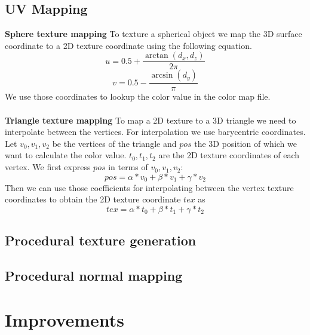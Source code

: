 \documentclass[sigconf, nonacm]{acmart}
\begin{document}
\subsection{UV Mapping}
\textbf{Sphere texture mapping} 
To texture a spherical object we map the 3D surface coordinate to a 2D texture coordinate using the following equation.
\[u=0.5+\frac{\arctan(d_x, d_z)}{2\pi}\]
\[v=0.5-\frac{\arcsin(d_y)}{\pi}\]
We use those coordinates to lookup the color value in the color map file.\\
\\
\textbf{Triangle texture mapping} 
To map a 2D texture to a 3D triangle we need to interpolate between the vertices. For interpolation we use barycentric coordinates.
Let \(v_0, v_1, v_2\) be the vertices of the triangle and \(pos\) the 3D position of which we want to calculate the color value. 
\(t_0, t_1, t_2\) are the 2D texture coordinates of each vertex.
We first express \(pos\)  in terms of \(v_0, v_1, v_2\):
\[pos=\alpha*v_0 + \beta*v_1 + \gamma*v_2\]
Then we can use those coefficients for interpolating between the vertex texture coordinates to obtain the 2D texture coordinate \(tex\) as
\[tex=\alpha*t_0 + \beta*t_1 + \gamma*t_2\]

\subsection{Procedural texture generation}

\subsection{Procedural normal mapping}

\section{Improvements}
\end{document}
